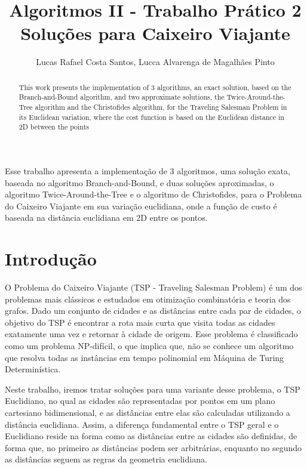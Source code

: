 \documentclass[12pt]{article}
\title{Algoritmos II - Trabalho Prático 2\\  Soluções para Caixeiro Viajante}
\author{Lucas Rafael Costa Santos\inst{1}, Lucca Alvarenga de Magalhães Pinto\inst{2}}
\begin{document}
 

\maketitle

\begin{abstract}
This work presents the implementation of 3 algorithms, an exact solution, based on the Branch-and-Bound algorithm, and two approximate solutions, the Twice-Around-the-Tree algorithm and the Christofides algorithm, for the Traveling Salesman Problem in its Euclidean variation, where the cost function is based on the Euclidean distance in 2D between the points
\end{abstract}
     
\begin{resumo} 
Esse trabalho apresenta a implementação de 3 algoritmos, uma solução exata, baseada no algoritmo Branch-and-Bound, e duas soluções aproximadas, o algoritmo Twice-Around-the-Tree e o algoritmo de Christofides, para o Problema do Caixeiro Viajante em sua variação euclidiana, onde a função de custo é baseada na distância euclidiana em 2D entre os pontos. 
\end{resumo}

\section{Introdução } \label{sec:firstpage}

O Problema do Caixeiro Viajante (TSP - Traveling Salesman Problem) é um dos problemas mais clássicos e estudados em otimização combinatória e teoria dos grafos. Dado um conjunto de cidades e as distâncias entre cada par de cidades, o objetivo do TSP é encontrar a rota mais curta que visita todas as cidades exatamente uma vez e retornar à cidade de origem. Esse problema é classificado como um problema NP-difícil, o que implica que, não se conhece um algoritmo que resolva todas as instâncias em tempo polinomial em Máquina de Turing Determinística.

Neste trabalho, iremos tratar soluções para uma variante desse problema, o TSP Euclidiano, no qual as cidades são representadas por pontos em um plano cartesiano bidimensional, e as distâncias entre elas são calculadas utilizando a distância euclidiana. Assim, a diferença fundamental entre o TSP geral e o Euclidiano reside na forma como as distâncias entre as cidades são definidas, de forma que, no primeiro as distâncias podem ser arbitrárias, enquanto no segundo as distâncias seguem as regras da geometria euclidiana.
\end{document}
